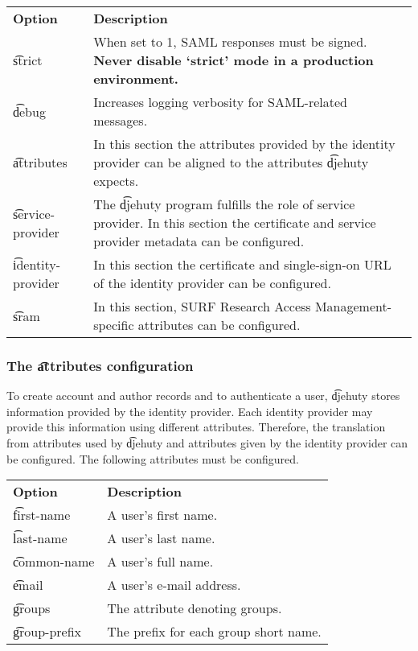 \begin{tabularx}{\textwidth}{*{1}{!{\VRule[-1pt]}l}!{\VRule[-1pt]}X}
  \headrow
  \textbf{Option}             & \textbf{Description}\\
  \t{strict}                  & When set to 1, SAML responses must be signed.
                                \textbf{Never disable `strict' mode in a
                                production environment.}\\
  \t{debug}                   & Increases logging verbosity for SAML-related messages.\\
  \t{attributes}              & In this section the attributes provided by the
                                identity provider can be aligned to the
                                attributes \t{djehuty} expects.\\
  \t{service-provider}        & The \t{djehuty} program fulfills the role of
                                service provider.  In this section the
                                certificate and service provider metadata
                                can be configured.\\
  \t{identity-provider}       & In this section the certificate and
                                single-sign-on URL of the identity provider
                                can be configured.\\
  \t{sram}                    & In this section, SURF Research Access
                                Management-specific attributes can be
                                configured.
\end{tabularx}

\subsubsection{The \t{attributes} configuration}

  To create account and author records and to authenticate a user, \t{djehuty}
  stores information provided by the identity provider.  Each identity provider
  may provide this information using different attributes.  Therefore, the
  translation from attributes used by \t{djehuty} and attributes given by the
  identity provider can be configured.  The following attributes must be
  configured.

\begin{tabularx}{\textwidth}{*{1}{!{\VRule[-1pt]}l}!{\VRule[-1pt]}X}
  \headrow
  \textbf{Option}             & \textbf{Description}\\
  \t{first-name}              & A user's first name.\\
  \t{last-name}               & A user's last name.\\
  \t{common-name}             & A user's full name.\\
  \t{email}                   & A user's e-mail address.\\
  \t{groups}                  & The attribute denoting groups.\\
  \t{group-prefix}            & The prefix for each group short name.
\end{tabularx}

